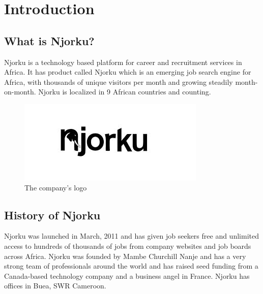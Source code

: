
\chapter{Introduction} %

\label{Chapter1} %


\newcommand{\keyword}[1]{\textbf{#1}}
\newcommand{\tabhead}[1]{\textbf{#1}}
\newcommand{\code}[1]{\texttt{#1}}
\newcommand{\file}[1]{\texttt{\bfseries#1}}
\newcommand{\option}[1]{\texttt{\itshape#1}}


\section{What is Njorku?}
Njorku is a technology based platform for career and recruitment services in Africa. It has product called Njorku which is an emerging job search engine for Africa, with thousands of unique visitors per month and growing steadily month-on-month. Njorku is localized in 9 African countries and counting. 

\begin{figure}[h]
\centering
\includegraphics{Figures/NjorkuLogo}
\decoRule
\caption[Njorku Logo]{The company's logo}
\label{fig:NjorkuLogo}
\end{figure}


\section{History of Njorku}

Njorku was launched in March, 2011 and has given job seekers free and unlimited access to hundreds of thousands of jobs from company websites and job boards across Africa. Njorku was founded by Mambe Churchill Nanje and has a very strong team of professionals around the world and has raised seed funding from a Canada-based technology company and a business angel in France. Njorku has offices in Buea, SWR Cameroon.

